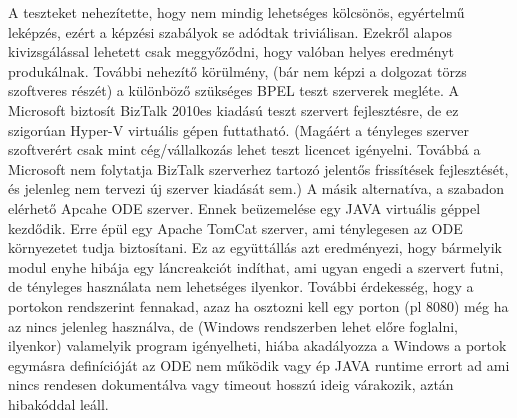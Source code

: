 A teszteket nehezítette, hogy nem mindig lehetséges kölcsönös, egyértelmű leképzés, ezért a képzési szabályok se adódtak triviálisan. Ezekről alapos kivizsgálással lehetett csak meggyőződni, hogy valóban helyes eredményt produkálnak. További nehezítő körülmény, (bár nem képzi a dolgozat törzs szoftveres részét) a különböző szükséges BPEL teszt szerverek megléte. A Microsoft biztosít BizTalk 2010es kiadású teszt szervert fejlesztésre, de ez szigorúan Hyper-V virtuális gépen futtatható. (Magáért a tényleges szerver szoftverért csak mint cég/vállalkozás lehet teszt licencet igényelni. Továbbá a Microsoft nem folytatja BizTalk szerverhez tartozó jelentős frissítések fejlesztését, és jelenleg nem tervezi új szerver kiadását sem.) A másik alternatíva, a szabadon elérhető Apcahe ODE szerver. Ennek beüzemelése egy JAVA virtuális géppel kezdődik. Erre épül egy Apache TomCat szerver, ami ténylegesen az ODE környezetet tudja biztosítani. Ez az együttállás azt eredményezi, hogy bármelyik modul enyhe hibája egy láncreakciót indíthat, ami ugyan engedi a szervert futni, de tényleges használata nem lehetséges ilyenkor. További érdekesség, hogy a portokon rendszerint fennakad, azaz ha osztozni kell egy porton (pl 8080) még ha az nincs jelenleg használva, de (Windows rendszerben lehet előre foglalni, ilyenkor) valamelyik program igényelheti, hiába akadályozza a Windows a portok egymásra definícióját  az ODE nem működik vagy ép JAVA runtime errort ad ami nincs rendesen dokumentálva vagy timeout hosszú ideig várakozik, aztán hibakóddal leáll. 
